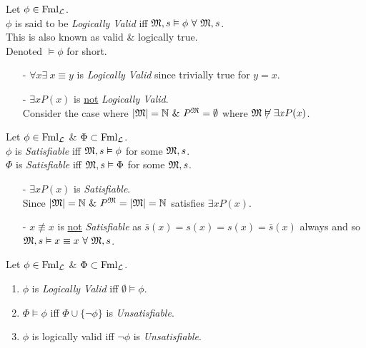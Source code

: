 \documentclass[11pt,a4paper]{article}
\begin{document}
Let $\phi\in\text{Fml}_{\mathcal{L}}$.\\
$\phi$ is said to be \textit{Logically Valid} iff $\mathfrak{M},s\vDash\phi\ \forall\ \mathfrak{M},s$.\\
\nb This is also known as valid \& logically true.\\
\nb Denoted $\vDash\phi$ for short.\\

\begin{itemize}
	\item[-] $\forall x\exists\ x\equiv y$ is \textit{Logically Valid} since trivially true for $y=x$.
	\item[-] $\exists xP(x)$ is \underline{not} \textit{Logically Valid}.\\
	Consider the case where $|\M|=\nats\ \&\ P^\M=\emptyset$ where $\mathfrak{M}\not\vDash\exists xP(x)$.
\end{itemize}

Let $\phi\in\text{Fml}_{\mathcal{L}}$ \& $\Phi\subset\text{Fml}_{\mathcal{L}}$.\\
$\phi$ is \textit{Satisfiable} iff $\mathfrak{M},s\vDash\phi$ for some $\mathfrak{M},s$.\\
$\Phi$ is \textit{Satisfiable} iff $\mathfrak{M},s\vDash\Phi$ for some $\mathfrak{M},s$.\\

\begin{itemize}
	\item[-] $\exists x P(x)$ is \textit{Satisfiable}.\\
	Since $|\M|=\nats\ \&\ P^\M=|\M|=\nats$ satisfies $\exists xP(x)$.
	\item[-] $x\not\equiv x$ is \underline{not} \textit{Satisfiable} as $\bar{s}(x)=s(x)=s(x)=\bar{s}(x)$ always and so $\M,s\vDash x\equiv x\ \forall\ \M,s$.
\end{itemize}

\theorem{}
Let $\phi\in\text{Fml}_{\mathcal{L}}$ \& $\Phi\subset\text{Fml}_{\mathcal{L}}$.
\begin{enumerate}
	\item $\phi$ is \textit{Logically Valid} iff $\emptyset\vDash\phi$.
	\item $\Phi\vDash\phi$ iff $\Phi\cup\{\neg\phi\}$ is \textit{Unsatisfiable}.
	\item $\phi$ is logically valid iff $\neg\phi$ is \textit{Unsatisfiable}.
\end{enumerate}
\end{document}
